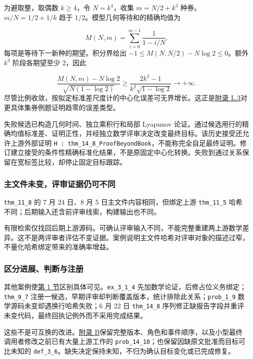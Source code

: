 为避取整，取偶数 $k\geq4$，令 $N=k^4$，收集 $m=N/2+k^3$ 种券。$m/N=1/2+1/k$ 趋于 $1/2$。模型几何等待和的精确均值为

\[
M(N,m)=\sum_{i=0}^{m-1}\frac{1}{1-i/N}.
\]
每项是等待下一新种的期望。积分界给出 $-1\leq M(N,N/2)-N\log2\leq0$。额外 $k^3$ 阶段各期望至少 2，因此

\[
\frac{M(N,m)-N\log2}{\sqrt{N(1-\log2)}}
\geq\frac{2k^3-1}{k^2\sqrt{1-\log2}}
\longrightarrow +\infty.
\]
尽管比例收敛，按拟定标准差尺度计的中心化误差可无界增长。这正是\hyperlink{l3}{附录 L.3}对更具体集券例题证明趋零的误差类型。

失败候选已构造几何时间、独立乘积行和局部 Lyapunov 论证。通过候选用行的精确均值标准差、证明正性，并经独立数学评审决定改变最终目标。该历史接受还允许上游外部证明 \nolinkurl{H : thm_14_8_ProofBeyondBook}，不能称完全自足最终证明。修订建立接受的条件性精确标准化结果，不是原固定中心化转换。失败到通过关系保留在宽标签比较，却停止固定目标跟踪。

\subsubsection[主文件未变，评审证据仍可不同]{\texorpdfstring{\protect\hypertarget{l4-3}{}主文件未变，评审证据仍可不同}{主文件未变，评审证据仍可不同}}
\nolinkurl{thm_11_8} 的 7 月 24 日、8 月 5 日主文件内容相同，但绑定上游 \nolinkurl{thm_11_5} 哈希不同；后期输入还含前评审线索，构建输出也不同。

有限检索仅找回后期上游源码。可确认评审输入不同，不能完整重建两上游数学差异。这不是两评审者评估不变证据。案例说明主文件哈希对评审对象的描述过窄，不量化哈希绑定带来的准确率增益。

\subsubsection[区分进展、判断与注册]{\texorpdfstring{\protect\hypertarget{l4-4}{}区分进展、判断与注册}{区分进展、判断与注册}}
其他案例使\href{zh.pdf\#section-1}{第 1 节}区别具体可见。\nolinkurl{ex_3_1_4} 先加数学论证，后修占位义务绑定；\nolinkurl{thm_9_7} 注册一候选，早期评审却判断覆盖版本，统计排除此关系；\nolinkurl{prob_1_9} 数学源码未变却遇换行哈希失败；6 月 22 日 \nolinkurl{thm_14_8} 序列修正缺报告字段并重评未变代码，最终回执记例外而不采用完成结果。

这些不是可互换的改进。\hyperlink{appendix-b}{附录 B}保留完整版本、角色和事件顺序，以及小型最终调用者修改之前已有大量上游工作的 \nolinkurl{prob_14_10}；也保留因缺原文批准而目标可比未知的 \nolinkurl{def_3_6}。缺失决定保持未知，不归为确认目标变化或已完成修复。

